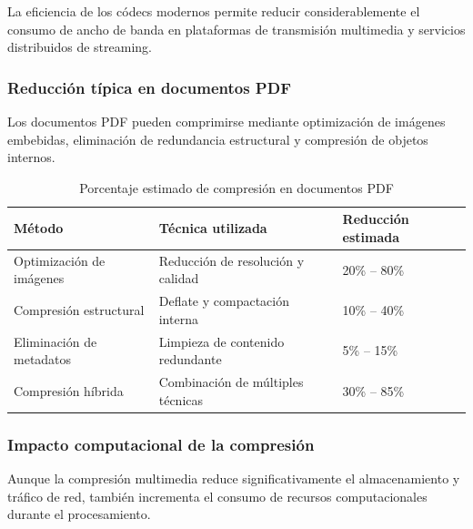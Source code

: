 \documentclass[12pt, oneside, letterpaper]{book}
\begin{document}
La eficiencia de los códecs modernos permite reducir considerablemente el consumo de ancho de banda en plataformas de transmisión multimedia y servicios distribuidos de streaming.

\subsubsection{Reducción típica en documentos PDF}

Los documentos PDF pueden comprimirse mediante optimización de imágenes embebidas, eliminación de redundancia estructural y compresión de objetos internos.

\begin{table}[H]
\centering
\caption{Porcentaje estimado de compresión en documentos PDF}
\label{tab:compresion_pdf}
\renewcommand{\arraystretch}{1.4}
\begin{tabularx}{\textwidth}{|p{4cm}|X|p{3cm}|}
\hline
\textbf{Método} & \textbf{Técnica utilizada} & \textbf{Reducción estimada} \\
\hline

Optimización de imágenes & Reducción de resolución y calidad & 20\% -- 80\% \\
\hline

Compresión estructural & Deflate y compactación interna & 10\% -- 40\% \\
\hline

Eliminación de metadatos & Limpieza de contenido redundante & 5\% -- 15\% \\
\hline

Compresión híbrida & Combinación de múltiples técnicas & 30\% -- 85\% \\
\hline

\end{tabularx}
\end{table}

\subsubsection{Impacto computacional de la compresión}

Aunque la compresión multimedia reduce significativamente el almacenamiento y tráfico de red, también incrementa el consumo de recursos computacionales durante el procesamiento.
\end{document}
